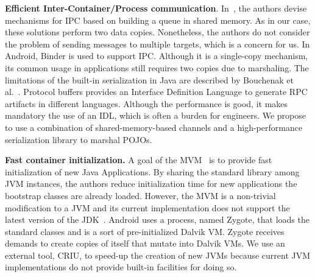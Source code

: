 \textbf{Efficient Inter-Container/Process communication}.
In~\cite{Unrau:708530}, the authors devise mechanisms for IPC based on building a queue in shared memory. As in our case, these solutions perform two data copies.
Nonetheless, the authors do not consider the problem of sending messages to multiple targets, which is a concern for us.
In Android, Binder is used to support IPC. 
Although it is a single-copy mechanism, its common usage in applications still requires two copies due to marshaling.
The limitations of the built-in serialization in Java are described by Bouchenak et al.~\cite{bouchenak2003techniques}.
Protocol buffers \cite{protobuf} provides an Interface Definition Language to generate RPC artifacts in different languages. 
Although the performance is good, it makes mandatory the use of an IDL, which is often a burden for engineers.
We propose to use a combination of shared-memory-based channels and a high-performance serialization library to marshal POJOs.


\textbf{Fast container initialization.} 
A goal of the MVM~\cite{czajkowski2012multitasking} is to provide fast initialization of new Java Applications.
By sharing the standard library among JVM instances, the authors reduce initialization time for new applications the bootstrap classes are already loaded.
However, the MVM is a non-trivial modification to a JVM and its current implementation does not support the latest version of the JDK~\cite{czajkowski2012multitasking}. 
Android \cite{Kalkov:2012:REA:2388936.2388955,Nagata:2013:MIA:2569436.2570296} uses a process, named Zygote, that loads the standard classes and is a sort of pre-initialized Dalvik VM.
Zygote receives demands to create copies of itself that mutate into Dalvik VMs. %
We use an external tool, CRIU, to speed-up the creation of new JVMs because current JVM implementations do not provide built-in facilities for doing so.